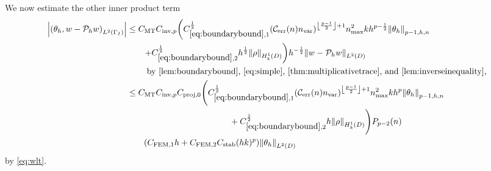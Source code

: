 We now estimate the other inner product term
\begin{align}
\abs{\IPLtGI{\thetah}{w - \Ph w}} &\leq \CMT\CinvVhp\mleft(\Cboundaryo^{\half} \mleft(\En\nvar\mright)^{\floor{\frac{p-1}2}+1}\nmax^2 k h^{p-\half} \Nfn{p-1,h,n}{\thetah}\mright.\nonumber\\
&\mleft.\quad\quad+ \Cboundaryt^{\half} h^{\half} \NHokD{\rho}\mright) h^{-\half}\NLtD{w - \Ph w}\nonumber\\
&\quad\quad\text{ by \cref{lem:boundarybound}, \cref{eq:simple}, \cref{thm:multiplicativetrace}, and \cref{lem:inverseinequality},}
\nonumber\\
&\leq \CMT \CinvVhp \Cprojfn{0}\Bigg(\Cboundaryo^{\half} \mleft(\En\nvar\mright)^{\floor{\frac{p-1}2}+1}\nmax^2 k h^{p} \Nfn{p-1,h,n}{\thetah}\nonumber\\
&\quad\quad\quad\quad\quad\quad\quad\quad\quad\quad\quad\quad+ \Cboundaryt^{\half} h \NHokD{\rho}\Bigg)\Pfn{p-2}\mleft(n\mright)\nonumber\\
&\quad\quad \mleft(\CFEMotilde h + \CFEMttilde \CAnk (hk)^p\mright)\NLtD{\thetah}\label{eq:innerprod2}
\end{align}
 by \cref{eq:wlt}.

